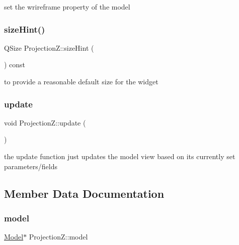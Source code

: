 set the wrireframe property of the model 

\mbox{\label{class_projection_z_a5baf9e15d828cff9501fd94fa622b32b}} 
\subsubsection{\texorpdfstring{size\+Hint()}{sizeHint()}}
{\footnotesize\ttfamily Q\+Size Projection\+Z\+::size\+Hint (\begin{DoxyParamCaption}{ }\end{DoxyParamCaption}) const\hspace{0.3cm}{\ttfamily [protected]}}



to provide a reasonable default size for the widget 

\mbox{\label{class_projection_z_abf7cbd3b5479c7805fbceecf3c68b0be}} 
\subsubsection{\texorpdfstring{update}{update}}
{\footnotesize\ttfamily void Projection\+Z\+::update (\begin{DoxyParamCaption}{ }\end{DoxyParamCaption})\hspace{0.3cm}{\ttfamily [slot]}}



the update function just updates the model view based on its currently set parameters/fields 



\subsection{Member Data Documentation}
\mbox{\label{class_projection_z_a72def73a612bcd05243ae8acad447908}} 
\subsubsection{\texorpdfstring{model}{model}}
{\footnotesize\ttfamily \mbox{\hyperlink{class_model}{Model}}$\ast$ Projection\+Z\+::model}



